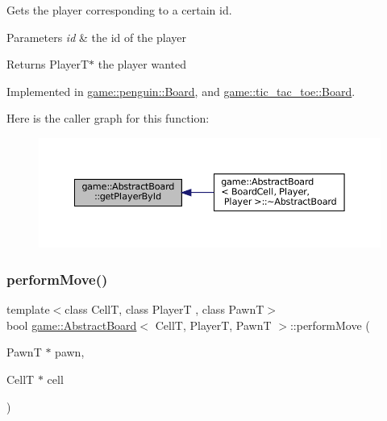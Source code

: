 Gets the player corresponding to a certain id. 


\begin{DoxyParams}{Parameters}
{\em id} & the id of the player \\
\hline
\end{DoxyParams}
\begin{DoxyReturn}{Returns}
Player\+T$\ast$ the player wanted 
\end{DoxyReturn}


Implemented in \hyperlink{classgame_1_1penguin_1_1_board_a8728b4381bc2e007710d275bb226cf95}{game\+::penguin\+::\+Board}, and \hyperlink{classgame_1_1tic__tac__toe_1_1_board_a7907b8fc363b7e33d585edbc7ec102ae}{game\+::tic\+\_\+tac\+\_\+toe\+::\+Board}.

Here is the caller graph for this function\+:
\nopagebreak
\begin{figure}[H]
\begin{center}
\leavevmode
\includegraphics[width=350pt]{classgame_1_1_abstract_board_a2ae30faf6d02d6d9757020a7ed7932cc_icgraph}
\end{center}
\end{figure}
\mbox{\label{classgame_1_1_abstract_board_ac2b6d96389ad0ac58d22323d75f91f97}} 
\subsubsection{\texorpdfstring{perform\+Move()}{performMove()}}
{\footnotesize\ttfamily template$<$class CellT, class PlayerT , class PawnT$>$ \\
bool \hyperlink{classgame_1_1_abstract_board}{game\+::\+Abstract\+Board}$<$ CellT, PlayerT, PawnT $>$\+::perform\+Move (\begin{DoxyParamCaption}\item[{PawnT $\ast$}]{pawn,  }\item[{CellT $\ast$}]{cell }\end{DoxyParamCaption})\hspace{0.3cm}{\ttfamily [virtual]}}



